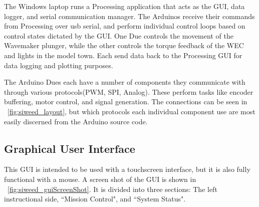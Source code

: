 \documentclass[11pt, letterpaper]{article}
\begin{document}
The Windows laptop runs a Processing application that acts as the GUI, data logger, and serial communication manager.
The Arduinos receive their commands from Processing over usb serial, and perform individual control loops based on control states dictated by the GUI.
One Due controls the movement of the Wavemaker plunger, while the other controls the torque feedback of the WEC and lights in the model town.
Each send data back to the Processing GUI for data logging and plotting purposes.

The Arduino Dues each have a number of components they communicate with through various protocols(PWM, SPI, Analog).
These perform tasks like encoder buffering, motor control, and signal generation.
The connections can be seen in \figurename~\ref{fig:siweed_layout}, but which protocols each individual component use are most easily discerned from the Arduino source code.

\subsection{Graphical User Interface}
This GUI is intended to be used with a touchscreen interface, but it is also fully functional with a mouse.
A screen shot of the GUI is shown in \figurename~\ref{fig:siweed_guiScreenShot}.
It is divided into three sections: The left instructional side, ``Mission Control", and ``System Status".
\end{document}
